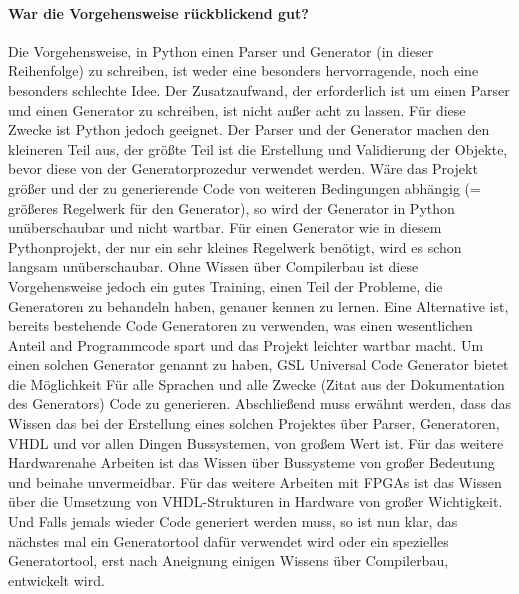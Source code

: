 \documentclass{article}
\newcommand{\nl}{\leavevmode\newline}
\begin{document}
\paragraph{War die Vorgehensweise rückblickend gut?}\nl
Die Vorgehensweise, in Python einen Parser und Generator (in dieser Reihenfolge) zu schreiben, ist weder eine besonders hervorragende, noch eine besonders schlechte Idee. Der Zusatzaufwand, der erforderlich ist um einen Parser und einen Generator zu schreiben, ist nicht außer acht zu lassen. Für diese Zwecke ist Python jedoch geeignet. Der Parser und der Generator machen den kleineren Teil aus, der größte Teil ist die Erstellung und Validierung der Objekte, bevor diese von der Generatorprozedur verwendet werden. Wäre das Projekt größer und der zu generierende Code von weiteren Bedingungen abhängig (= größeres Regelwerk für den Generator), so wird der Generator in Python unüberschaubar und nicht wartbar. Für einen Generator wie in diesem Pythonprojekt, der nur ein sehr kleines Regelwerk benötigt, wird es schon langsam unüberschaubar. Ohne Wissen über Compilerbau ist diese Vorgehensweise jedoch ein gutes Training, einen Teil der Probleme, die Generatoren zu behandeln haben, genauer kennen zu lernen.
Eine Alternative ist, bereits bestehende Code Generatoren zu verwenden, was einen wesentlichen Anteil and Programmcode spart und das Projekt leichter wartbar macht. Um einen solchen Generator genannt zu haben, \glqq GSL Universal Code Generator \grqq bietet die Möglichkeit \glqq Für alle Sprachen und alle Zwecke \grqq (Zitat aus der Dokumentation des Generators) Code zu generieren.
\nl\nl
Abschließend muss erwähnt werden, dass das Wissen das bei der Erstellung eines solchen Projektes über Parser, Generatoren, VHDL und vor allen Dingen Bussystemen, von großem Wert ist. Für das weitere Hardwarenahe Arbeiten ist das Wissen über Bussysteme von großer Bedeutung und beinahe unvermeidbar. Für das weitere Arbeiten mit FPGAs ist das Wissen über die Umsetzung von VHDL-Strukturen in Hardware von großer Wichtigkeit. Und Falls jemals wieder Code generiert werden muss, so ist nun klar, das nächstes mal ein Generatortool dafür verwendet wird oder ein spezielles Generatortool, erst nach Aneignung einigen Wissens über Compilerbau, entwickelt wird.
\end{document}
